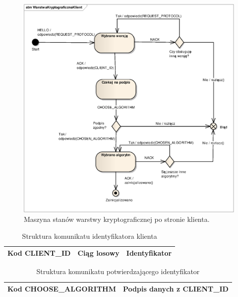 \begin{figure}[h]
  \caption{Maszyna stanów warstwy kryptograficznej po stronie klienta.}
  \label{fig:kryptoKlient}
  \centering
\includegraphics[width=1\textwidth]{img/kryptoKlient}
\end{figure}

\begin{table}[H]
\centering
\caption{Struktura komunikatu identyfikatora klienta }

\begin{tabular}{|p{3cm}|p{3cm}|p{6cm}|}
\hline
Kod CLIENT\_ID & Ciąg losowy & Identyfikator\\
\hline
\end{tabular}
\end{table}

\begin{table}[H]
\centering
\caption{Struktura komunikatu potwierdzającego identyfikator }

\begin{tabular}{|p{6cm}|p{6cm}|}
\hline
Kod CHOOSE\_ALGORITHM & Podpis danych z CLIENT\_ID\\
\hline
\end{tabular}
\end{table}


